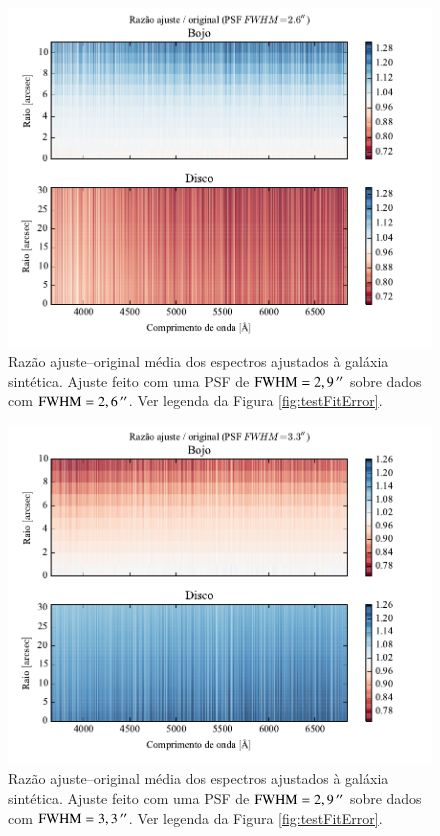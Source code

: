 \begin{figure}
	\includegraphics{figuras/simulation_error_psf26}
	\caption[Razão ajuste--original (teste com PSF $\mathrm{FWHM} = 2,6\,\arcs$)]
	{Razão ajuste--original média dos espectros ajustados à galáxia sintética.
	Ajuste feito com uma PSF de $\mathrm{FWHM} = 2,9\,^{\prime\prime}$ sobre
	dados com $\mathrm{FWHM} = 2,6\,\arcs$. Ver legenda da Figura
	\ref{fig:testFitError}.}
	\label{fig:testFitError26}
\end{figure}

\begin{figure}
	\includegraphics{figuras/simulation_error_psf33}
	\caption[Razão ajuste--original (teste com PSF $\mathrm{FWHM} = 3,3\,\arcs$)]
	{Razão ajuste--original média dos espectros ajustados à galáxia sintética.
	Ajuste feito com uma PSF de $\mathrm{FWHM} = 2,9\,^{\prime\prime}$ sobre
	dados com $\mathrm{FWHM} = 3,3\,\arcs$. Ver legenda da Figura
	\ref{fig:testFitError}.}
	\label{fig:testFitError33}
\end{figure}

